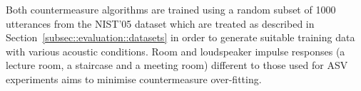 
Both countermeasure algorithms are trained using a random subset of 1000 utterances from the NIST'05 dataset which are treated as described in Section~\ref{subsec::evaluation::datasets} in order to generate suitable training data with various acoustic conditions.  %
Room and loudspeaker impulse responses (a lecture room, a staircase and a meeting room) different to those used for ASV experiments aims to minimise countermeasure over-fitting.

